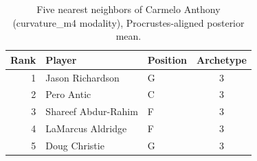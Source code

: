 \begin{table}[htbp]
  \centering\small
  \begin{tabular}{rllc}
    \toprule
    Rank & Player & Position & Archetype \\
    \midrule
    1 & Jason Richardson & G & 3 \\
    2 & Pero Antic & C & 3 \\
    3 & Shareef Abdur-Rahim & F & 3 \\
    4 & LaMarcus Aldridge & F & 3 \\
    5 & Doug Christie & G & 3 \\
    \bottomrule
  \end{tabular}
  \caption{Five nearest neighbors of Carmelo Anthony (curvature_m4 modality), Procrustes-aligned posterior mean.}
  \label{tab:Carmelo_Anthony_neighbors_curvature_m4}
\end{table}

